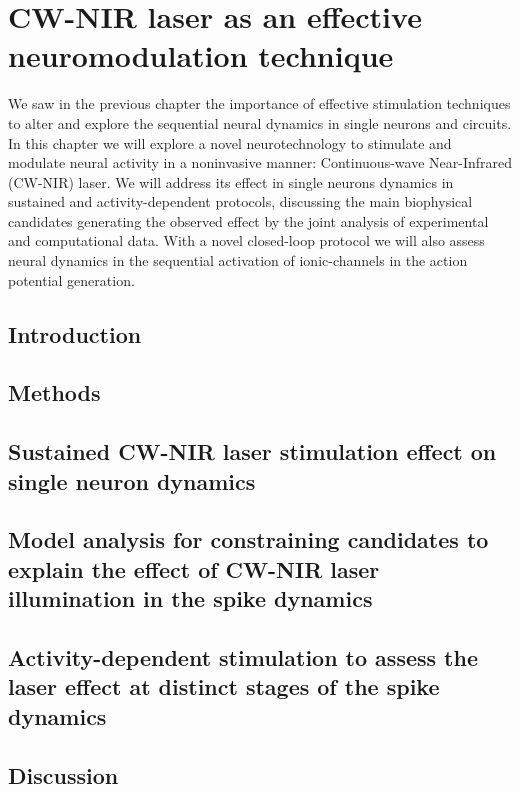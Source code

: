 \chapter{CW-NIR laser as an effective neuromodulation technique}
\label{c-laser}

We saw in the previous chapter the importance of effective stimulation techniques to alter and explore the sequential neural dynamics in single neurons and circuits. In this chapter we will explore a novel neurotechnology to stimulate and modulate neural activity in a noninvasive manner: Continuous-wave Near-Infrared (CW-NIR) laser. We will address its effect in single neurons dynamics in sustained and activity-dependent protocols, discussing the main biophysical candidates generating the observed effect by the joint analysis of experimental and computational data. With a novel closed-loop protocol we will also assess neural dynamics in the sequential activation of ionic-channels in the action potential generation. 

\section{Introduction}
\label{sect:intro} 



\section{Methods}



\section{Sustained CW-NIR laser stimulation effect on single neuron dynamics}
\label{sec:sustained effect}


\section{Model analysis for constraining candidates to explain the effect of CW-NIR laser illumination in the spike dynamics}
\label{sec:laser models}


\section{Activity-dependent stimulation to assess the laser effect at distinct stages of the spike dynamics} 
\label{sec:activity dependent}



\section{Discussion}
